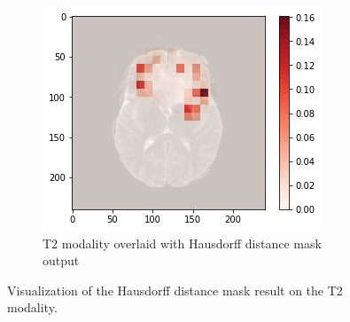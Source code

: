 \begin{figure}[H]
\begin{subfigure}{.33\textwidth}
    \end{subfigure}
        \begin{subfigure}{.33\textwidth}
        \centering
        \includegraphics[width=\linewidth]{chapters/07_brats3d/images/11_t2_hdm.png}
        \caption{T2 modality overlaid with Hausdorff distance mask output}
    \end{subfigure}
    \caption{Visualization of the Hausdorff distance mask result on the T2 modality.}
    \label{brats3d_t2}
\end{figure}

